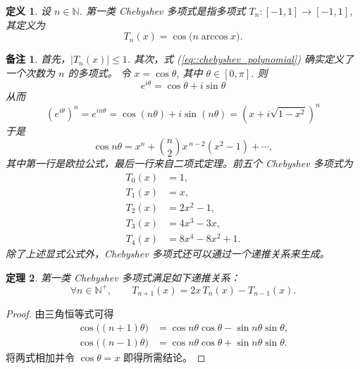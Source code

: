 \documentclass[a4paper]{ctexart}
\newtheorem{theorem}{定理}
\newtheorem{remark}{备注}
\newtheorem{definition}[theorem]{定义} %
\numberwithin{theorem}{section}
\numberwithin{equation}{section}
\numberwithin{figure}{section}
\numberwithin{remark}{section}
\begin{document}
\begin{definition}
    \label{def::chebyshev_polynomial}
设 $n\in\mathbb{N}$. 第一类 Chebyshev 多项式是指多项式 $T_n:[-1,1]\to[-1,1]$, 其定义为
\begin{equation}
    \label{eq::chebyshev_polynomial}
T_n(x)=\cos\bigl(n\arccos x\bigr).
\end{equation}
\end{definition}

\begin{remark}
首先，$\lvert T_n(x)\rvert\le 1$. 其次，式 (\ref{eq::chebyshev_polynomial}) 确实定义了一个次数为 $n$ 的多项式。
令 $x=\cos\theta$, 其中 $\theta\in[0,\pi]$. 则
\begin{equation*}
e^{i\theta}=\cos\theta+i\sin\theta
\end{equation*}
从而
\begin{equation*}
\left(e^{i\theta}\right)^{n}=e^{in\theta}=\cos(n\theta)+i\sin(n\theta)=\left(x+i\sqrt{1-x^{2}}\right)^{n}
\end{equation*}
于是
\begin{equation*}
\cos n\theta
= x^{n}+\binom{n}{2}x^{\,n-2}(x^{2}-1)+\cdots ,
\end{equation*}
其中第一行是欧拉公式，最后一行来自二项式定理。前五个 Chebyshev 多项式为
\begin{align*}
T_0(x)&=1,\\
T_1(x)&=x,\\
T_2(x)&=2x^{2}-1,\\
T_3(x)&=4x^{3}-3x,\\
T_4(x)&=8x^{4}-8x^{2}+1.
\end{align*}
除了上述显式公式外，Chebyshev 多项式还可以通过一个递推关系来生成。
\end{remark}

\begin{theorem}
    \label{thm::chebyshev_recurrence}
第一类 Chebyshev 多项式满足如下递推关系：
\begin{equation}
    \label{eq::chebyshev_recurrence}
\forall n\in\mathbb{N}^+,\qquad T_{n+1}(x)=2x\,T_n(x)-T_{n-1}(x).
\end{equation}
\end{theorem}

\begin{proof}
由三角恒等式可得
\begin{align*}
\cos\bigl((n+1)\theta\bigr)&=\cos n\theta \cos\theta-\sin n\theta \sin\theta,\\
\cos\bigl((n-1)\theta\bigr)&=\cos n\theta \cos\theta+\sin n\theta \sin\theta.
\end{align*}
将两式相加并令 $\cos\theta=x$ 即得所需结论。
\end{proof}
\end{document}
